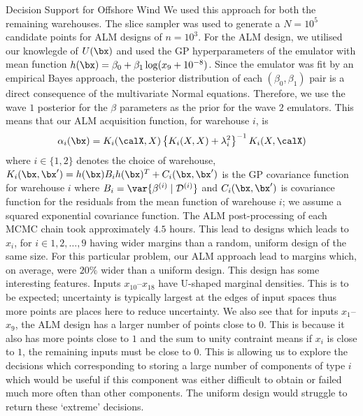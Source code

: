 \begin{chapter}{Decision Support for Offshore Wind \label{Ch:ds-for-ow}}
We used this approach for both the remaining warehouses. The slice sampler was used to generate a $N = 10^5$ candidate points for ALM designs of $n = 10^3$. For the ALM design, we utilised our knowlegde of $U(\bx)$ and used the GP hyperparameters of the emulator with mean function $h(\bx) = \beta_0 + \beta_1 \log (x_9 + 10^{-8})$. Since the emulator was fit by an empirical Bayes approach, the posterior distribution of each $(\beta_0, \beta_1)$ pair is a direct consequence of the multivariate Normal equations. Therefore, we use the wave $1$ posterior for the $\beta$ parameters as the prior for the wave $2$ emulators. This means that our ALM acquisition function, for warehouse $i$, is
\begin{eqnarray}
  \alpha_i(\bx) = K_i(\calX, X) \left\{K_i(X, X) + \lambda_i^2\right\}^{-1} K_i(X, \calX)
\end{eqnarray}
where $i \in \{1, 2\}$ denotes the choice of warehouse, $K_i(\bx, \bx') = h(\bx) B_i h(\bx)^T + C_i(\bx, \bx')$ is the GP covariance function for warehouse $i$ where $B_i = \var\{\beta^{(i)} \mid \mathcal{D}^{(i)} \}$ and $C_i(\bx, \bx')$ is covariance function for the residuals from the mean function of warehouse $i$; we assume a squared exponential covariance function. The ALM post-processing of each MCMC chain took approximately $4.5$ hours. This lead to designs which leads to $x_i$, for $i \in {1, 2, \ldots, 9}$ having wider margins than a random, uniform design of the same size. For this particular problem, our ALM approach lead to margins which, on average, were $20\%$ wider than a uniform design. This design has some interesting features. Inputs $x_{10}$--$x_{18}$ have U-shaped marginal densities. This is to be expected; uncertainty is typically largest at the edges of input spaces thus more points are places here to reduce uncertainty. We also see that for inputs $x_1$--$x_9$, the ALM design has a larger number of points close to $0$. This is because it also has more points close to $1$ and the sum to unity contraint means if $x_i$ is close to $1$, the remaining inputs must be close to $0$. This is allowing us to explore the decisions which corresponding to storing a large number of components of type $i$ which would be useful if this component was either difficult to obtain or failed much more often than other components. The uniform design would struggle to return these `extreme' decisions.


\end{chapter}
